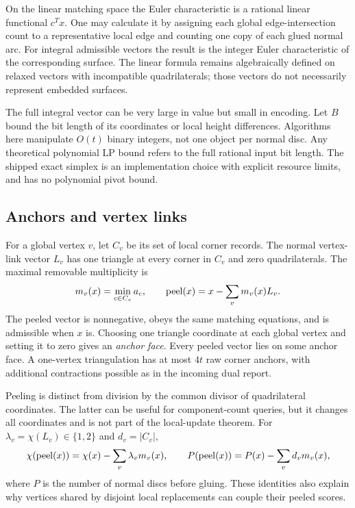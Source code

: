 On the linear matching space the Euler characteristic is a rational
linear functional $c^Tx$. One may calculate it by assigning each global
edge-intersection count to a representative local edge and counting one
copy of each glued normal arc. For integral admissible vectors the result
is the integer Euler characteristic of the corresponding surface.
The linear formula remains algebraically defined on relaxed vectors
with incompatible quadrilaterals; those vectors do not necessarily
represent embedded surfaces.

The full integral vector can be very large in value but small in encoding.
Let $B$ bound the bit length of its coordinates or local height differences.
Algorithms here manipulate $O(t)$ binary integers, not one object per
normal disc. Any theoretical polynomial LP bound refers to the full
rational input bit length. The shipped exact simplex is an implementation
choice with explicit resource limits, and has no polynomial pivot bound.

\subsection{Anchors and vertex links}

For a global vertex $v$, let $C_v$ be its set of local corner records.
The normal vertex-link vector $L_v$ has one triangle at every corner in
$C_v$ and zero quadrilaterals. The maximal removable multiplicity is
\[
 m_v(x)=\min_{c\in C_v} a_c,
 \qquad
 \operatorname{peel}(x)=x-\sum_v m_v(x)L_v.
\]
The peeled vector is nonnegative, obeys the same matching equations,
and is admissible when $x$ is. Choosing one triangle coordinate at each
global vertex and setting it to zero gives an \emph{anchor face}. Every
peeled vector lies on some anchor face. A one-vertex triangulation has
at most $4t$ raw corner anchors, with additional contractions possible
as in the incoming dual report.

Peeling is distinct from division by the common divisor of quadrilateral
coordinates. The latter can be useful for component-count queries, but
it changes all coordinates and is not part of the local-update theorem.
For $\lambda_v=\chi(L_v)\in\{1,2\}$ and $d_v=|C_v|$,
\begin{equation}\label{eq:peel-identities}
 \chi(\operatorname{peel}(x))=\chi(x)-\sum_v\lambda_vm_v(x),
 \qquad
 P(\operatorname{peel}(x))=P(x)-\sum_vd_vm_v(x),
\end{equation}
where $P$ is the number of normal discs before gluing. These identities
also explain why vertices shared by disjoint local replacements can
couple their peeled scores.

